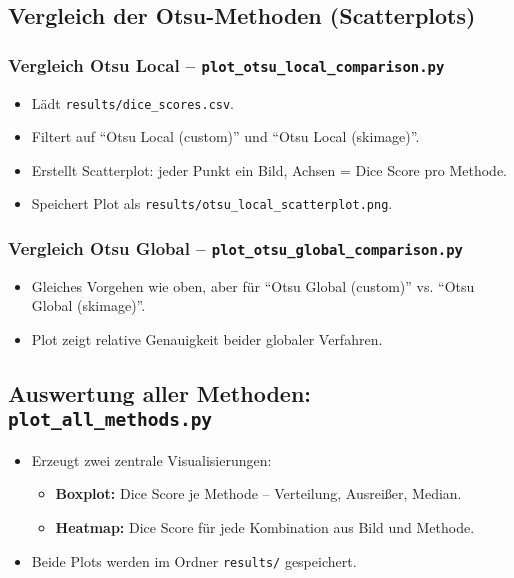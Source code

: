 \documentclass[a4paper,12pt]{article}
\begin{document}
\vspace{1em}
\subsection{Vergleich der Otsu-Methoden (Scatterplots)}

\subsubsection*{Vergleich Otsu Local -- \texttt{plot\_otsu\_local\_comparison.py}}

\begin{itemize}
    \item Lädt \texttt{results/dice\_scores.csv}.
    \item Filtert auf ``Otsu Local (custom)'' und ``Otsu Local (skimage)''.
    \item Erstellt Scatterplot: jeder Punkt ein Bild, Achsen = Dice Score pro Methode.
    \item Speichert Plot als \texttt{results/otsu\_local\_scatterplot.png}.
\end{itemize}

\subsubsection*{Vergleich Otsu Global -- \texttt{plot\_otsu\_global\_comparison.py}}

\begin{itemize}
    \item Gleiches Vorgehen wie oben, aber für ``Otsu Global (custom)'' vs. ``Otsu Global (skimage)''.
    \item Plot zeigt relative Genauigkeit beider globaler Verfahren.
\end{itemize}

\vspace{1em}
\subsection{Auswertung aller Methoden: \texttt{plot\_all\_methods.py}}

\begin{itemize}
    \item Erzeugt zwei zentrale Visualisierungen:
    \begin{itemize}
        \item \textbf{Boxplot:} Dice Score je Methode – Verteilung, Ausreißer, Median.
        \item \textbf{Heatmap:} Dice Score für jede Kombination aus Bild und Methode.
    \end{itemize}
    \item Beide Plots werden im Ordner \texttt{results/} gespeichert.
\end{itemize}
\end{document}
